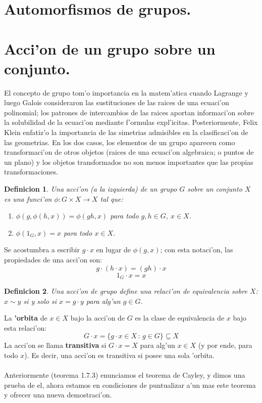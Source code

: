 \documentclass[a4paper,openright,12pt]{report}
\numberwithin{equation}{section} %
\newtheorem{definicion}{Definicion}[section] %
\begin{document}
\section{Automorfismos de grupos.}
\section{Acci'on de un grupo sobre un conjunto.}
El concepto de grupo tom'o importancia en la matem'atica cuando Lagrange y luego Galois consideraron las sustituciones de las raices de una ecuaci'on polinomial; los patrones de intercambios de las raices aportan informaci'on sobre la solubilidad de la ecuaci'on mediante f'ormulas expl'icitas. Posteriormente, Felix Klein enfatiz'o la importancia de las simetrias admisibles en la clasificaci'on de las geometrias. En los dos casos, los elementos de un grupo aparecen como transformaci'on de otros objetos (raices de una ecuaci'on algebraica; o puntos de un plano) y los objetos transformados no son menos importantes que las propias transformaciones.
\begin{definicion}
Una acci'on (a la izquierda) de un grupo $G$ sobre un conjunto $X$ es una funci'on $\phi : G \times X \rightarrow X$ tal que: 
\begin{enumerate}
\item $\phi(g, \phi(h, x))=\phi(gh, x)$ para todo $g, h \in G$, $x \in X$.
\item $\phi(1_{G},x)=x$ para todo $x \in X$.
\end{enumerate}
\end{definicion}
Se acostumbra a escribir $g \cdot x$ en lugar de $\phi(g,x)$; con esta notaci'on, las propiedades de una acci'on son:
\[
g \cdot (h \cdot x)=(gh)\cdot x
\]
\[
1_{G}\cdot x = x
\]
\begin{definicion}
Una acci'on de grupo define una relaci'on de equivalencia sobre $X$: $x\sim y$ si y solo si $x=g \cdot y$ para alg'un $g \in G$.
\end{definicion}
La \textbf{'orbita} de $x \in X$ bajo la acci'on de $G$ es la clase de equivalencia de $x$ bajo esta relaci'on:
\[
G \cdot x = \{g\cdot x \in X\, :\,g\in G \}\subseteq X
\]
La acci'on se llama \textbf{transitiva} si $G \cdot x=X$ para alg'un $x \in X$ (y por ende, para todo $x$). Es decir, una acci'on es transitiva si posee una sola 'orbita. \\
\\
Anteriormente (teorema 1.7.3) enunciamos el teorema de Cayley, y dimos una prueba de el, ahora estamos en condiciones de puntualizar a'un mas este teorema y ofrecer una nueva demostraci'on.
\end{document}
